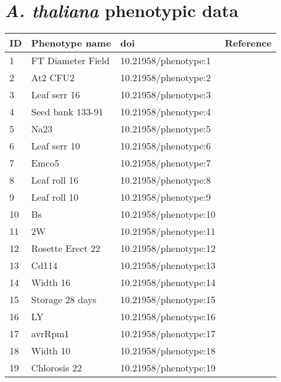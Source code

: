 
\chapter{\textit{A. thaliana} phenotypic data} %
\label{AppendixB} %

\begin{longtable}{p{} p{} p{} p{}}
  \toprule
  ID & Phenotype name & doi & Reference \\
  \midrule
 1 & FT Diameter Field & 10.21958/phenotype:1 & \cite{atwell2010}\\
 2 & At2 CFU2 & 10.21958/phenotype:2 & \cite{atwell2010}\\
 3 & Leaf serr 16 & 10.21958/phenotype:3 & \cite{atwell2010}\\
 4 & Seed bank 133-91 & 10.21958/phenotype:4 & \cite{atwell2010}\\
 5 & Na23 & 10.21958/phenotype:5 & \cite{atwell2010}\\
 6 & Leaf serr 10 & 10.21958/phenotype:6 & \cite{atwell2010}\\
 7 & Emco5 & 10.21958/phenotype:7 & \cite{atwell2010}\\
 8 & Leaf roll 16 & 10.21958/phenotype:8 & \cite{atwell2010}\\
 9 & Leaf roll 10 & 10.21958/phenotype:9 & \cite{atwell2010}\\
 10 & Bs & 10.21958/phenotype:10 & \cite{atwell2010}\\
 11 & 2W & 10.21958/phenotype:11 & \cite{atwell2010}\\
 12 & Rosette Erect 22 & 10.21958/phenotype:12 & \cite{atwell2010}\\
 13 & Cd114 & 10.21958/phenotype:13 & \cite{atwell2010}\\
 14 & Width 16 & 10.21958/phenotype:14 & \cite{atwell2010}\\
 15 & Storage 28 days & 10.21958/phenotype:15 & \cite{atwell2010}\\
 16 & LY & 10.21958/phenotype:16 & \cite{atwell2010}\\
 17 & avrRpm1 & 10.21958/phenotype:17 & \cite{atwell2010}\\
 18 & Width 10 & 10.21958/phenotype:18 & \cite{atwell2010}\\
 19 & Chlorosis 22 & 10.21958/phenotype:19 & \cite{atwell2010}\\

\end{longtable}
